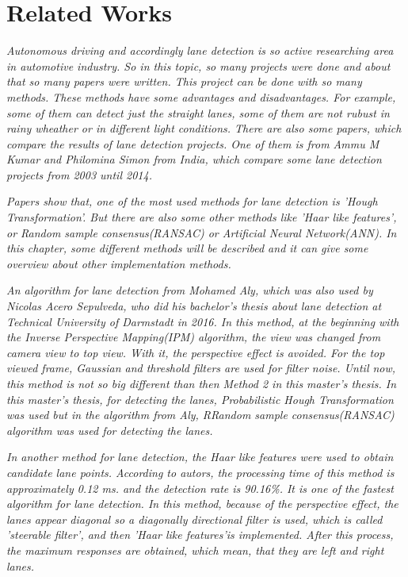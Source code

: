 %
\chapter{Related Works}\label{cha:Related Works}

\emph{\color{blue}Autonomous driving and accordingly lane detection is so active researching area in automotive industry. So in this topic, so many projects were done and about that so many papers were written. This project can be done with so many methods. These methods have some advantages and disadvantages. For example, some of them can detect just the straight lanes, some of them are not rubust in rainy wheather or in different light conditions. There are also some papers, which compare the results of lane detection projects. One of them is from Ammu M Kumar and Philomina Simon from India, which compare some lane detection projects from 2003 until 2014. }\cite{Review_of_Lane_Detection}
 
\emph{\color{blue}Papers show that, one of the most used methods for lane detection is 'Hough Transformation'. But there are also some other methods like 'Haar like features', or Random sample consensus(RANSAC) or Artificial Neural Network(ANN). In this chapter, some different methods will be described and it can give some overview about other implementation methods.} 

\emph{\color{blue}An algorithm for lane detection from Mohamed Aly, which was also used by Nicolas Acero Sepulveda, who did his bachelor's thesis about lane detection at Technical University of Darmstadt in 2016.\cite{Bachelorthesis_Nicolas} In this method, at the beginning with the Inverse Perspective Mapping(IPM) algorithm, the view was changed from camera view to top view. With it, the perspective effect is avoided. For the top viewed frame, Gaussian and threshold filters are used for filter noise. Until now, this method is not so big different than then Method 2 in this master's thesis. In this master's thesis, for detecting the lanes, Probabilistic Hough Transformation was used but in the algorithm from Aly, RRandom sample consensus(RANSAC) algorithm was used for detecting the lanes.}

\emph{\color{blue}In another method\cite{An_Efficient_Lane_Detection} for lane detection, the Haar like features were used to obtain candidate lane points. According to autors, the processing time of this method is approximately 0.12 ms. and the detection rate is 90.16\%. It is one of the fastest algorithm for lane detection. In this method, because of the perspective effect, the lanes appear diagonal so a diagonally directional filter is used, which is called 'steerable filter', and then 'Haar like features'is implemented. After this process, the maximum responses are obtained, which mean, that they are left and right lanes.} 